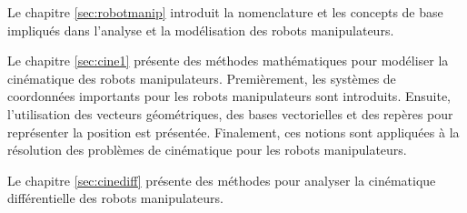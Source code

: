 Le chapitre \ref{sec:robotmanip} introduit la nomenclature et les concepts de base impliqués dans l'analyse et la modélisation des robots manipulateurs. 

Le chapitre \ref{sec:cine1} présente des méthodes mathématiques pour modéliser la cinématique des robots manipulateurs. Premièrement, les systèmes de coordonnées importants pour les robots manipulateurs sont introduits. Ensuite, l'utilisation des vecteurs géométriques, des bases vectorielles et des repères pour représenter la position est présentée. Finalement, ces notions sont appliquées à la résolution des problèmes de cinématique pour les robots manipulateurs. 

Le chapitre \ref{sec:cinediff} présente des méthodes pour analyser la cinématique différentielle des robots manipulateurs. 